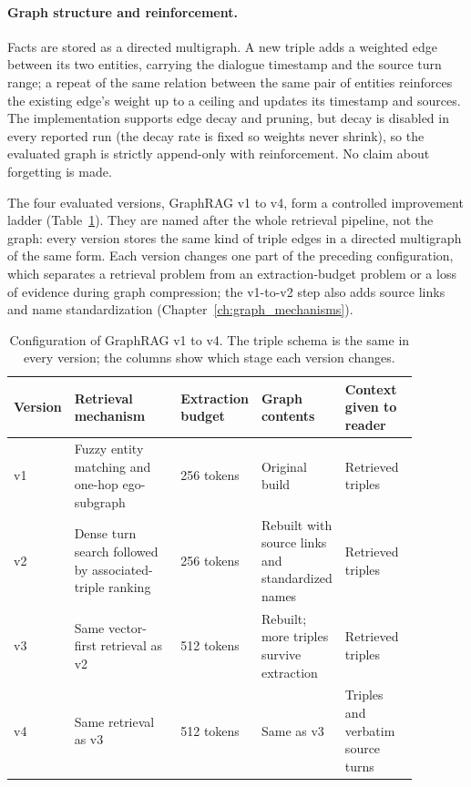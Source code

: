 \paragraph{Graph structure and reinforcement.} Facts are stored as a directed multigraph. A new
triple adds a weighted edge between its two entities, carrying the dialogue timestamp and the source
turn range; a repeat of the same relation between the same pair of entities reinforces the existing
edge's weight up to a ceiling and updates its timestamp and sources. The implementation supports edge
decay and pruning, but decay is disabled in every reported run (the decay rate is fixed so weights
never shrink), so the evaluated graph is strictly append-only with reinforcement. No claim about
forgetting is made.

The four evaluated versions, GraphRAG v1 to v4, form a controlled improvement ladder
(Table~\ref{tab:graph_versions}). They are named after the whole retrieval pipeline, not the graph:
every version stores the same kind of triple edges in a directed multigraph of the same form.
Each version changes one part of the preceding configuration, which separates a retrieval problem from
an extraction-budget problem or a loss of evidence during graph compression; the v1-to-v2 step also
adds source links and name standardization (Chapter~\ref{ch:graph_mechanisms}).

\begin{table}[t]
  \centering
  \small
  \begin{tabular}{@{}p{0.08\linewidth}p{0.30\linewidth}p{0.12\linewidth}p{0.19\linewidth}p{0.19\linewidth}@{}}
    \toprule
    Version & Retrieval mechanism & Extraction budget & Graph contents & Context given to reader \\
    \midrule
    v1 & Fuzzy entity matching and one-hop ego-subgraph & 256 tokens & Original build & Retrieved triples \\
    v2 & Dense turn search followed by associated-triple ranking & 256 tokens & Rebuilt with source links and standardized names & Retrieved triples \\
    v3 & Same vector-first retrieval as v2 & 512 tokens & Rebuilt; more triples survive extraction & Retrieved triples \\
    v4 & Same retrieval as v3 & 512 tokens & Same as v3 & Triples and verbatim source turns \\
    \bottomrule
  \end{tabular}
  \caption{Configuration of GraphRAG v1 to v4. The triple schema is the same in every version; the
  columns show which stage each version changes.}
  \label{tab:graph_versions}
\end{table}

